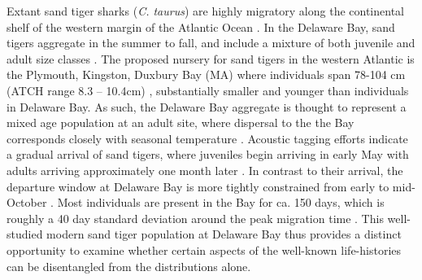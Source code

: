\documentclass[]{rsos}%
\begin{document}
Extant sand tiger sharks (\emph{C. taurus}) are highly migratory along the continental shelf of the western margin of the Atlantic Ocean \cite{haulsee2018spatial, Teter2015, Kneebone2012, kneebone2014movement}.
In the Delaware Bay, sand tigers aggregate in the summer to fall, and include a mixture of both juvenile and adult size classes \cite{Teter2015, haulsee2018spatial}. %
The proposed nursery for sand tigers in the western Atlantic is the Plymouth, Kingston, Duxbury Bay (MA) where individuals span 78-104 cm (ATCH range 8.3 – 10.4cm) \cite{Kneebone2012}, substantially smaller and younger than individuals in Delaware Bay.
As such, the Delaware Bay aggregate is thought to represent a mixed age population at an adult site, where dispersal to the the Bay corresponds closely with seasonal temperature \cite{Teter2015}.
Acoustic tagging efforts indicate a gradual arrival of sand tigers, where juveniles begin arriving in early May with adults arriving approximately one month later \cite{haulsee2018spatial}. 
In contrast to their arrival, the departure window at Delaware Bay is more tightly constrained from early to mid-October \cite{Teter2015, haulsee2018spatial}.
Most individuals are present in the Bay for ca. 150 days, which is roughly a 40 day standard deviation around the peak  migration time \cite{haulsee2018spatial}. 
This well-studied modern sand tiger population at Delaware Bay thus provides a distinct opportunity to examine whether certain aspects of the well-known life-histories can be disentangled from the distributions alone.
 
\end{document}
